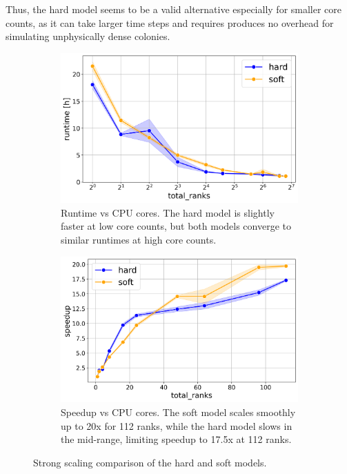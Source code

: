 \documentclass[conference]{IEEEtran}
\begin{document}
Thus, the hard model seems to be a valid alternative especially for smaller core counts, as it can take larger time steps and requires produces no overhead for simulating unphysically dense colonies.


\begin{figure}[H]
    \centering
    \begin{subfigure}[b]{1\linewidth}
        \includegraphics[width=\linewidth]{figures/runtimes/strong_scaling_runtime_hard_soft.png}
        \caption{Runtime vs CPU cores. The hard model is slightly faster at low core counts, but both models converge to similar runtimes at high core counts.}
        \label{fig:runtime_hard_soft}
    \end{subfigure}


    \begin{subfigure}[b]{1\linewidth}
        \includegraphics[width=\linewidth]{figures/runtimes/strong_scaling_speedup_hard_soft.png}
        \caption{Speedup vs CPU cores. The soft model scales smoothly up to 20x for 112 ranks, while the hard model slows in the mid-range, limiting speedup to 17.5x at 112 ranks.}
        \label{fig:speedup_hard_soft}
    \end{subfigure}

    \caption{Strong scaling comparison of the hard and soft models.}
\end{figure}
\end{document}
